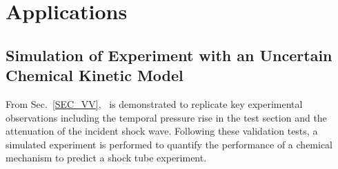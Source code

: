 \section{Applications}\label{SEC_APPLICATIONS}
\subsection{Simulation of Experiment with an Uncertain Chemical Kinetic Model}
From Sec.~\ref{SEC_VV}, \stnshk\ is demonstrated to replicate key experimental observations including the temporal pressure rise in the test section and the attenuation of the incident shock wave. Following these validation tests, a simulated experiment is performed to quantify the performance of a chemical mechanism to predict a shock tube experiment. 

